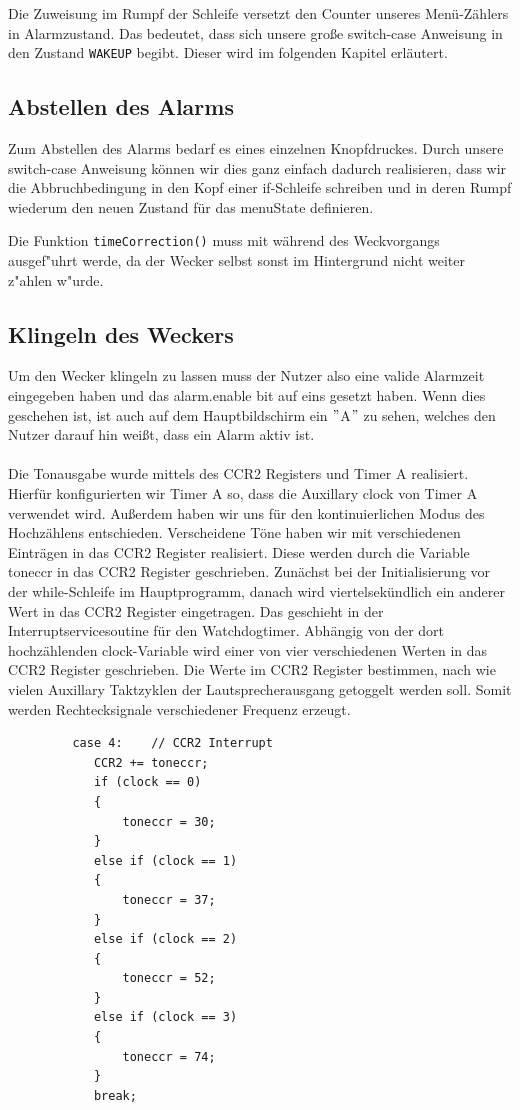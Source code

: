 \documentclass[openright,twoside,11pt,a4paper]{scrartcl}
\begin{document}
\begin{flushleft}
	 	Die Zuweisung im Rumpf der Schleife versetzt den Counter unseres Menü-Zählers in Alarmzustand. Das bedeutet, dass sich unsere große switch-case Anweisung in den Zustand \lstinline[language=c++]|WAKEUP| begibt. Dieser wird im folgenden Kapitel erläutert.
	 	\subsection{Abstellen des Alarms}
	 	Zum Abstellen des Alarms bedarf es eines einzelnen Knopfdruckes. Durch unsere switch-case Anweisung können wir dies ganz einfach dadurch realisieren, dass wir die Abbruchbedingung in den Kopf einer if-Schleife schreiben und in deren Rumpf wiederum den neuen Zustand für das menuState definieren.
	 	
	 	Die Funktion \lstinline[language=c==++]|timeCorrection()| muss mit während des Weckvorgangs ausgef"uhrt werde, da der Wecker selbst sonst im Hintergrund nicht weiter z"ahlen w"urde. \\
	 
	 	\subsection{Klingeln des Weckers}
	 	Um den Wecker klingeln zu lassen muss der Nutzer also eine valide Alarmzeit eingegeben haben und das alarm.enable bit auf eins gesetzt haben. Wenn dies geschehen ist, ist auch auf dem Hauptbildschirm ein $"$A$"$ zu sehen, welches den Nutzer darauf hin weißt, dass ein Alarm aktiv ist. \\
	 	\ \\
	 	Die Tonausgabe wurde mittels des CCR2 Registers und Timer A realisiert. Hierfür konfigurierten wir Timer A so, dass die Auxillary clock von Timer A verwendet wird. Außerdem haben wir uns für den kontinuierlichen Modus des Hochzählens entschieden. Verscheidene Töne haben wir mit verschiedenen Einträgen in das CCR2 Register realisiert. Diese werden durch die Variable toneccr in das CCR2 Register geschrieben. Zunächst bei der Initialisierung vor der while-Schleife im Hauptprogramm, danach wird viertelsekündlich ein anderer Wert in das CCR2 Register eingetragen. Das geschieht in der Interruptservicesoutine für den Watchdogtimer. Abhängig von der dort hochzählenden clock-Variable wird einer von vier verschiedenen Werten in das CCR2 Register geschrieben. Die Werte im CCR2 Register bestimmen, nach wie vielen Auxillary Taktzyklen der Lautsprecherausgang getoggelt werden soll. Somit werden Rechtecksignale verschiedener Frequenz erzeugt.
	 	\begin{lstlisting}
	 	 case 4:	// CCR2 Interrupt
	 		CCR2 += toneccr;
		 	if (clock == 0)
		 	{
		 		toneccr = 30;
		 	}
		 	else if (clock == 1)
		 	{
		 		toneccr = 37;
		 	}
		 	else if (clock == 2)
		 	{
		 		toneccr = 52;
		 	}
		 	else if (clock == 3)
		 	{
		 		toneccr = 74;
		 	}
	 		break;
	 	\end{lstlisting}


\end{flushleft}
\end{document}
